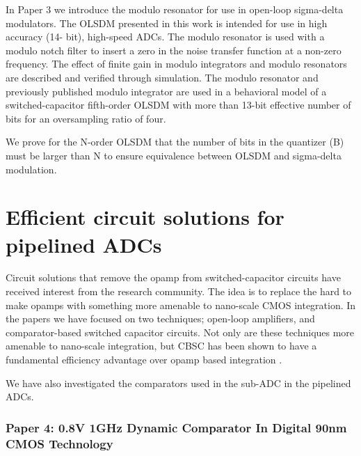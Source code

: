 In  Paper 3 we introduce the modulo resonator for 
use in open-loop sigma-delta modulators. The OLSDM 
presented in this work is intended for use in high accuracy (14- 
bit), high-speed ADCs. 
The modulo resonator is used with a modulo notch filter 
to insert a zero in the noise transfer function at a non-zero 
frequency. 
The effect of finite gain in modulo integrators and modulo 
resonators are described and verified through simulation. 
The modulo resonator and previously published modulo integrator are
used in a behavioral model of a switched-capacitor  
fifth-order OLSDM with more than 13-bit effective number of 
bits for an oversampling ratio of four.

 We prove for the N-order 
OLSDM that the number of bits in the quantizer (B) must be 
larger than N to ensure equivalence between OLSDM and sigma-delta modulation. 



\section{Efficient circuit solutions for pipelined ADCs}
Circuit solutions that remove the opamp from switched-capacitor
circuits have received interest from the research community. The idea
is to replace the hard to make opamps with something more amenable to
nano-scale CMOS integration. In the papers we have focused on two
techniques; open-loop amplifiers, and comparator-based switched
capacitor circuits. Not only are these techniques more amenable to
nano-scale integration, but CBSC has been shown to have a fundamental
efficiency advantage over opamp based integration \cite{lee08}. 

We have also investigated the
comparators used in the sub-ADC in the pipelined ADCs.



\subsubsection{Paper 4:  0.8V 1GHz Dynamic Comparator In Digital 90nm CMOS
  Technology}

